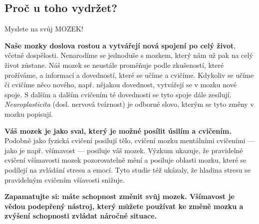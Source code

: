 	\clearpage
	\subsection{Proč u toho vydržet?}

		 Myslete na svůj MOZEK! 

		\textbf{Naše mozky doslova rostou a vytvářejí nová spojení po celý život}, včetně dospělosti. Nenarodíme se jednoduše s mozkem, který nám už pak na celý život zůstane. Náš mozek se neustále proměňuje podle zkušeností, které prožíváme, a informací a dovedností, které se učíme a cvičíme. Kdykoliv se učíme či cvičíme něco nového, např. nějakou dovednost, vytvářejí se v mozku nové spoje. S dalším a dalším cvičením té dovednosti se tyto spoje dále zesilují. \emph{Neuroplasticita} (dosl. nervová tvárnost) je odborné slovo, kterým se tyto změny v mozku popisují.

		 
		\textbf{Váš mozek je jako sval, který je možné posílit úsilím a cvičením.} Podobně jako fyzická cvičení posilují tělo, cvičení mozku mentálními cvičeními — jako je např. všímavost — posiluje váš mozek. Výzkum ukazuje, že pravidelné cvičení všímavosti mozek pozorovatelně mění a posiluje oblasti mozku, které se podílejí na zvládání stresu a emocí. Tyto studie též ukázaly, že hladina stresu se pravidelným cvičením všíavosti snižuje.

		
		\textbf{Zapamatujte si: máte schopnost změnit svůj mozek. Všímavost je vědou podepřený nástroj, který můžete používat ke změně mozku a zvýšení schopnosti zvládat náročné situace.}

